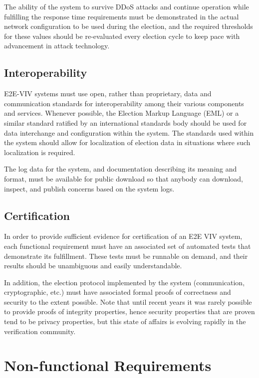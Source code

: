 The ability of the system to survive DDoS attacks and continue
operation while fulfilling the response time requirements must be
demonstrated in the actual network configuration to be used during the
election, and the required thresholds for these values should be
re-evaluated every election cycle to keep pace with advancement in
attack technology.

\subsection{Interoperability}

E2E-VIV systems must use open, rather than proprietary, data and
communication standards for interoperability among their various
components and services. Whenever possible, the Election Markup
Language (EML) or a similar standard ratified by an international
standards body should be used for data interchange and configuration
within the system. The standards used within the system should allow
for localization of election data in situations where such
localization is required.

The log data for the system, and documentation describing its meaning
and format, must be available for public download so that anybody can
download, inspect, and publish concerns based on the system logs. 

\subsection{Certification}

In order to provide sufficient evidence for certification of an E2E
VIV system, each functional requirement must have an associated set of
automated tests that demonstrate its fulfillment. These tests must be
runnable on demand, and their results should be unambiguous and easily
understandable.

In addition, the election protocol implemented by the system
(communication, cryptographic, etc.) must have associated formal
proofs of correctness and security to the extent possible. Note that
until recent years it was rarely possible to provide proofs of
integrity properties, hence security properties that are proven
tend to be privacy properties, but this state of affairs is evolving
rapidly in the verification community.

\section{Non-functional Requirements}

